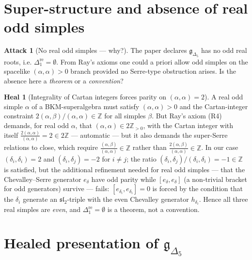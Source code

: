 \documentclass[11pt]{article}
\theoremstyle{definition}
\newtheorem{attack}[theorem]{Attack}
\newtheorem{heal}[theorem]{Heal}
\providecommand{\Z}{\mathbb{Z}}
\providecommand{\g}{\mathfrak{g}}
\providecommand{\dre}{\Delta^{\mathrm{re}}}
\providecommand{\Deltafive}{\Delta_5}
\begin{document}
\section{Super-structure and absence of real odd simples}

\begin{attack}[No real odd simples --- why?]
\label{att:no-real-odd}
The paper declares $\g_{\Deltafive}$ has no odd real roots, i.e.
$\dre_1=\emptyset$. From Ray's axioms one could a priori allow odd
simples on the spacelike $(\alpha,\alpha)>0$ branch provided no
Serre-type obstruction arises. Is the absence here a \emph{theorem} or
a \emph{convention}?
\end{attack}

\begin{heal}[Integrality of Cartan integers forces parity on $(\alpha,\alpha)=2$]
\label{heal:no-real-odd}
A real odd simple $\alpha$ of a BKM-superalgebra must satisfy
$(\alpha,\alpha)>0$ and the Cartan-integer constraint
$2(\alpha,\beta)/(\alpha,\alpha)\in\Z$ for all simples $\beta$. But
Ray's axiom (R4) demands, for real odd $\alpha$, that
$(\alpha,\alpha)\in 2\Z_{>0}$, with the Cartan integer with itself
$\tfrac{2(\alpha,\alpha)}{(\alpha,\alpha)}=2\in 2\Z$ --- automatic ---
but it also demands the super-Serre relations to close, which require
$\tfrac{(\alpha,\beta)}{(\alpha,\alpha)}\in\Z$ rather than
$\tfrac{2(\alpha,\beta)}{(\alpha,\alpha)}\in\Z$. In our case
$(\delta_i,\delta_i)=2$ and $(\delta_i,\delta_j)=-2$ for $i\ne j$; the
ratio $(\delta_i,\delta_j)/(\delta_i,\delta_i)=-1\in\Z$ is satisfied,
but the additional refinement needed for real odd simples --- that the
Chevalley--Serre generator $e_\delta$ have odd parity while
$[e_\delta,e_\delta]$ (a non-trivial bracket for odd generators) survive
--- fails: $[e_{\delta_i},e_{\delta_i}]=0$ is forced by the condition
that the $\delta_i$ generate an $\mathfrak{sl}_2$-triple with the even
Chevalley generator $h_{\delta_i}$. Hence all three real simples are
\emph{even}, and $\dre_1=\emptyset$ is a theorem, not a convention.
\end{heal}

\section{Healed presentation of $\g_{\Deltafive}$}
\end{document}
